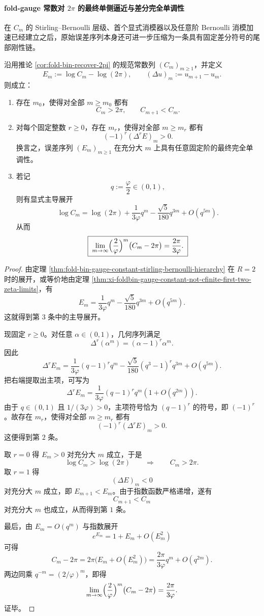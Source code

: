 \paragraph{fold-gauge 常数对 \texorpdfstring{$2\pi$}{2pi} 的最终单侧逼近与差分完全单调性}
在 \(C_m\) 的 Stirling--Bernoulli 层级、首个显式消模器以及任意阶 Bernoulli 消模加速已经建立之后，原始误差序列本身还可进一步压缩为一条具有固定差分符号的尾部刚性链。

\begin{theorem}\label{thm:xi-foldbin-gauge-constant-eventual-complete-monotonicity}
沿用推论 \ref{cor:fold-bin-recover-2pi} 的规范常数列 \((C_m)_{m\ge 1}\)，并定义
\[
E_m:=\log C_m-\log(2\pi),
\qquad
(\Delta u)_m:=u_{m+1}-u_m.
\]
则成立：
\begin{enumerate}
  \item 存在 \(m_0\)，使得对全部 \(m\ge m_0\) 都有
  \[
  C_m>2\pi,
  \qquad
  C_{m+1}<C_m.
  \]
  \item 对每个固定整数 \(r\ge 0\)，存在 \(m_r\)，使得对全部 \(m\ge m_r\) 都有
  \[
  (-1)^r(\Delta^r E)_m>0.
  \]
  换言之，误差序列 \((E_m)_{m\ge 1}\) 在充分大 \(m\) 上具有任意固定阶的最终完全单调性。
  \item 若记
  \[
  q:=\frac{\varphi}{2}\in(0,1),
  \]
  则有显式主导展开
  \[
  \boxed{\;
  \log C_m
  =
  \log(2\pi)
  +\frac{1}{3\varphi}q^m
  -\frac{\sqrt5}{180}q^{3m}
  +O(q^{5m}).\;}
  \]
  从而
  \[
  \boxed{\;
  \lim_{m\to\infty}
  \Bigl(\frac{2}{\varphi}\Bigr)^m\bigl(C_m-2\pi\bigr)
  =
  \frac{2\pi}{3\varphi}.\;}
  \]
\end{enumerate}
\end{theorem}
\begin{proof}
由定理 \ref{thm:fold-bin-gauge-constant-stirling-bernoulli-hierarchy} 在 \(R=2\) 时的展开，或等价地由定理 \ref{thm:xi-foldbin-gauge-constant-not-cfinite-first-two-zeta-limits}，有
\[
E_m
=
\frac{1}{3\varphi}q^m
-\frac{\sqrt5}{180}q^{3m}
+O(q^{5m}).
\]
这就得到第 \(3\) 条中的主导展开。

现固定 \(r\ge 0\)。对任意 \(\alpha\in(0,1)\)，几何序列满足
\[
\Delta^r(\alpha^m)=(\alpha-1)^r\alpha^m.
\]
因此
\[
\Delta^r E_m
=
\frac{1}{3\varphi}(q-1)^r q^m
-\frac{\sqrt5}{180}(q^3-1)^r q^{3m}
+O(q^{5m}).
\]
把右端提取出主项，可写为
\[
\Delta^r E_m
=
\frac{1}{3\varphi}(q-1)^r q^m
\left(
1+O(q^{2m})
\right).
\]
由于 \(q\in(0,1)\) 且 \(1/(3\varphi)>0\)，主项符号恰为 \((q-1)^r\) 的符号，即 \((-1)^r\)。故存在 \(m_r\)，使得对全部 \(m\ge m_r\) 都有
\[
(-1)^r(\Delta^r E)_m>0.
\]
这便得到第 \(2\) 条。

取 \(r=0\) 得 \(E_m>0\) 对充分大 \(m\) 成立，于是
\[
\log C_m>\log(2\pi)
\qquad\Longrightarrow\qquad
C_m>2\pi.
\]
取 \(r=1\) 得
\[
(\Delta E)_m<0
\]
对充分大 \(m\) 成立，即 \(E_{m+1}<E_m\)。由于指数函数严格递增，遂有
\[
C_{m+1}<C_m
\]
对充分大 \(m\) 也成立，从而得到第 \(1\) 条。

最后，由 \(E_m=O(q^m)\) 与指数展开
\[
e^{E_m}=1+E_m+O(E_m^2)
\]
可得
\[
C_m-2\pi
=
2\pi\bigl(E_m+O(E_m^2)\bigr)
=
\frac{2\pi}{3\varphi}q^m+O(q^{2m}).
\]
两边同乘 \(q^{-m}=(2/\varphi)^m\)，即得
\[
\lim_{m\to\infty}
\Bigl(\frac{2}{\varphi}\Bigr)^m\bigl(C_m-2\pi\bigr)
=
\frac{2\pi}{3\varphi}.
\]
证毕。
\end{proof}

\endinput
